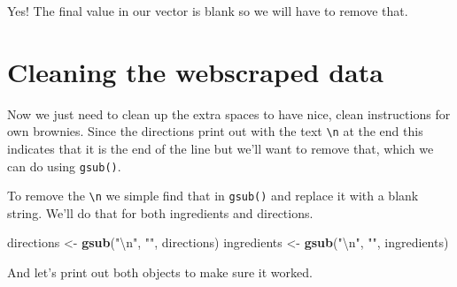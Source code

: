\documentclass[
  12pt,
]{book}
\newenvironment{Shaded}{\begin{snugshade}}{\end{snugshade}}
\newcommand{\CharTok}[1]{\textcolor[rgb]{0.5,0.5,0.5}{#1}}
\newcommand{\KeywordTok}[1]{\textcolor[rgb]{0.27,0.27,0.27}{\textbf{#1}}}
\newcommand{\NormalTok}[1]{#1}
\newcommand{\StringTok}[1]{\textcolor[rgb]{0.5,0.5,0.5}{#1}}
\begin{document}
\begin{Shaded}
\begin{Highlighting}[]
\end{Highlighting}
\end{Shaded}

Yes! The final value in our vector is blank so we will have to remove that.

\hypertarget{cleaning-the-webscraped-data}{%
\section{Cleaning the webscraped data}\label{cleaning-the-webscraped-data}}

Now we just need to clean up the extra spaces to have nice, clean instructions for own brownies. Since the directions print out with the text \texttt{\textbackslash{}n} at the end this indicates that it is the end of the line but we'll want to remove that, which we can do using \texttt{gsub()}.

To remove the \texttt{\textbackslash{}n} we simple find that in \texttt{gsub()} and replace it with a blank string. We'll do that for both ingredients and directions.

\begin{Shaded}
\begin{Highlighting}[]
\NormalTok{directions \textless{}{-}}\StringTok{ }\KeywordTok{gsub}\NormalTok{(}\StringTok{"}\CharTok{\textbackslash{}n}\StringTok{"}\NormalTok{, }\StringTok{""}\NormalTok{, directions)}
\NormalTok{ingredients \textless{}{-}}\StringTok{ }\KeywordTok{gsub}\NormalTok{(}\StringTok{"}\CharTok{\textbackslash{}n}\StringTok{"}\NormalTok{, }\StringTok{""}\NormalTok{, ingredients)}
\end{Highlighting}
\end{Shaded}

And let's print out both objects to make sure it worked.
\end{document}
